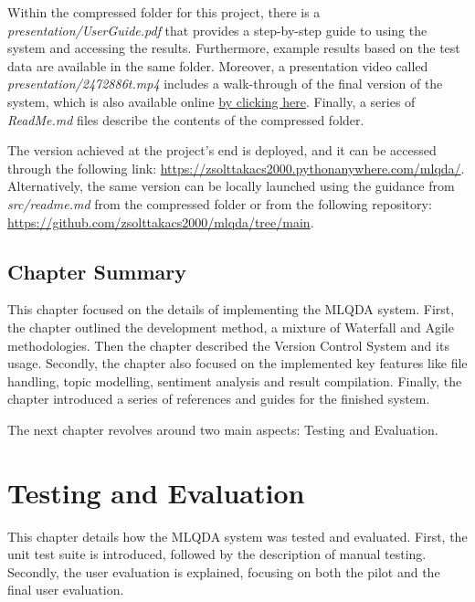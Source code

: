 \documentclass{l4proj}
\begin{document}
Within the compressed folder for this project, there is a \textit{presentation/UserGuide.pdf} that provides a step-by-step guide to using the system and accessing the results. Furthermore, example results based on the test data are available in the same folder. Moreover, a presentation video called \textit{presentation/2472886t.mp4} includes a walk-through of the final version of the system, which is also available online \href{https://gla-my.sharepoint.com/:v:/g/personal/2472886t_student_gla_ac_uk/ERPu8Y0Ln7pMtQkLxoOH7mQBA9LOqRGrGdXHpU5_Cwm9ng?e=fjSEA3}{by clicking here}. Finally, a series of \textit{ReadMe.md} files describe the contents of the compressed folder.

The version achieved at the project's end is deployed, and it can be accessed through the following link: \href{https://zsolttakacs2000.pythonanywhere.com/mlqda/}{https://zsolttakacs2000.pythonanywhere.com/mlqda/}. Alternatively, the same version can be locally launched using the guidance from \textit{src/readme.md} from the compressed folder or from the following repository: \href{https://github.com/zsolttakacs2000/mlqda/tree/main}{https://github.com/zsolttakacs2000/mlqda/tree/main}.

\section{Chapter Summary}
This chapter focused on the details of implementing the MLQDA system. First, the chapter outlined the development method, a mixture of Waterfall and Agile methodologies. Then the chapter described the Version Control System and its usage. Secondly, the chapter also focused on the implemented key features like file handling, topic modelling, sentiment analysis and result compilation. Finally, the chapter introduced a series of references and guides for the finished system.

The next chapter revolves around two main aspects: Testing and Evaluation.


\chapter{Testing and Evaluation}
This chapter details how the MLQDA system was tested and evaluated. First, the unit test suite is introduced, followed by the description of manual testing. Secondly, the user evaluation is explained, focusing on both the pilot and the final user evaluation. 
\end{document}
